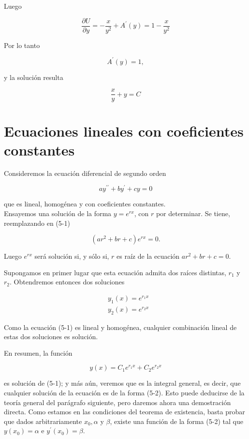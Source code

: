 \documentclass[10pt]{article}
\theoremstyle{plain}
\theoremstyle{definition}
\theoremstyle{remark}
\begin{document}
Luego

$$
\frac{\partial U}{\partial y}=-\frac{x}{y^{2}}+A^{\prime}(y)=1-\frac{x}{y^{2}}
$$

Por lo tanto

$$
A^{\prime}(y)=1,
$$

y la solución resulta

$$
\frac{x}{y}+y=C
$$

\section{Ecuaciones lineales con coeficientes constantes}
Consideremos la ecuación diferencial de segundo orden


\begin{equation*}
a y^{\prime \prime}+b y^{\prime}+c y=0 \tag{5-1}
\end{equation*}


que es lineal, homogénea y con coeficientes constantes.\\
Ensayemos una solución de la forma $y=e^{r x}$, con $r$ por determinar. Se tiene, reemplazando en (5-1)

$$
\left(a r^{2}+b r+c\right) e^{r x}=0 .
$$

Luego $e^{r x}$ será solución si, y sólo si, $r$ es raíz de la ecuación $a r^{2}+b r+c=0$.

Supongamos en primer lugar que esta ecuación admita dos raíces distintas, $r_{1}$ y $r_{2}$. Obtendremos entonces dos soluciones

$$
\begin{aligned}
& y_{1}(x)=e^{r_{1} x} \\
& y_{2}(x)=e^{r_{2} x}
\end{aligned}
$$

Como la ecuación (5-1) es lineal y homogénea, cualquier combinación lineal de estas dos soluciones es solución.

En resumen, la función


\begin{equation*}
y(x)=C_{1} e^{r_{1} x}+C_{2} e^{r_{2} x} \tag{$5\cdot2$}
\end{equation*}


es solución de (5-1); y más aún, veremos que es la integral general, es decir, que cualquier solución de la ecuación es de la forma (5-2). Esto puede deducirse de la teoría general del parágrafo siguiente, pero daremos ahora una demostración directa. Como estamos en las condiciones del teorema de existencia, basta probar que dados arbitrariamente $x_{0}, \alpha$ y $\beta$, existe una función de la forma (5-2) tal que $y\left(x_{0}\right)=\alpha$ e $y^{\prime}\left(x_{0}\right)=\beta$.
\end{document}
